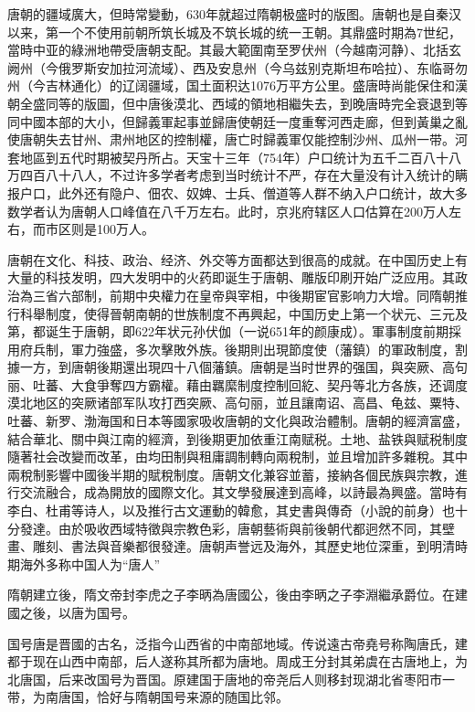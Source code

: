 唐朝的疆域廣大，但時常變動，630年就超过隋朝极盛时的版图。唐朝也是自秦汉以来，第一个不使用前朝所筑长城及不筑长城的统一王朝。其鼎盛时期為7世纪，當時中亚的綠洲地帶受唐朝支配。其最大範圍南至罗伏州（今越南河静）、北括玄阙州（今俄罗斯安加拉河流域）、西及安息州（今乌兹别克斯坦布哈拉）、东临哥勿州（今吉林通化）的辽阔疆域，国土面积达1076万平方公里。盛唐時尚能保住和漢朝全盛同等的版圖，但中唐後漠北、西域的領地相繼失去，到晚唐時完全衰退到等同中國本部的大小，但歸義軍起事並歸唐使朝廷一度重奪河西走廊，但到黃巢之亂使唐朝失去甘州、肃州地区的控制權，唐亡时歸義軍仅能控制沙州、瓜州一带。河套地區到五代时期被契丹所占。天宝十三年（754年）户口统计为五千二百八十八万四百八十八人，不过许多学者考虑到当时统计不严，存在大量没有计入统计的瞒报户口，此外还有隐户、佃农、奴婢、士兵、僧道等人群不纳入户口统计，故大多数学者认为唐朝人口峰值在八千万左右。此时，京兆府辖区人口估算在200万人左右，而市区则是100万人。

唐朝在文化、科技、政治、经济、外交等方面都达到很高的成就。在中国历史上有大量的科技发明，四大发明中的火药即诞生于唐朝、雕版印刷开始广泛应用。其政治為三省六部制，前期中央權力在皇帝與宰相，中後期宦官影响力大增。同隋朝推行科舉制度，使得晉朝南朝的世族制度不再興起，中国历史上第一个状元、三元及第，都诞生于唐朝，即622年状元孙伏伽（一说651年的颜康成）。軍事制度前期採用府兵制，軍力強盛，多次擊敗外族。後期則出現節度使（藩鎮）的軍政制度，割據一方，到唐朝後期還出現四十八個藩鎮。唐朝是当时世界的强国，與突厥、高句丽、吐蕃、大食爭奪四方霸權。藉由羈縻制度控制回紇、契丹等北方各族，还调度漠北地区的突厥诸部军队攻打西突厥、高句丽，並且讓南诏、高昌、龟兹、粟特、吐蕃、新罗、渤海国和日本等國家吸收唐朝的文化與政治體制。唐朝的經濟富盛，結合華北、關中與江南的經濟，到後期更加依重江南赋税。土地、盐铁與赋税制度隨著社会改變而改革，由均田制與租庸調制轉向兩稅制，並且增加許多雜稅。其中兩稅制影響中國後半期的賦稅制度。唐朝文化兼容並蓄，接納各個民族與宗教，進行交流融合，成為開放的國際文化。其文學發展達到高峰，以詩最為興盛。當時有李白、杜甫等诗人，以及推行古文運動的韓愈，其史書與傳奇（小說的前身）也十分發達。由於吸收西域特徵與宗教色彩，唐朝藝術與前後朝代都迥然不同，其壁畫、雕刻、書法與音樂都很發達。唐朝声誉远及海外，其歷史地位深重，到明清時期海外多称中国人为“唐人”

隋朝建立後，隋文帝封李虎之子李昞為唐國公，後由李昞之子李淵繼承爵位。在建國之後，以唐为国号。

国号唐是晋國的古名，泛指今山西省的中南部地域。传说遠古帝堯号称陶唐氏，建都于现在山西中南部，后人遂称其所都为唐地。周成王分封其弟虞在古唐地上，为北唐国，后来改国号为晋国。原建国于唐地的帝尧后人则移封现湖北省枣阳市一带，为南唐国，恰好与隋朝国号来源的随国比邻。

